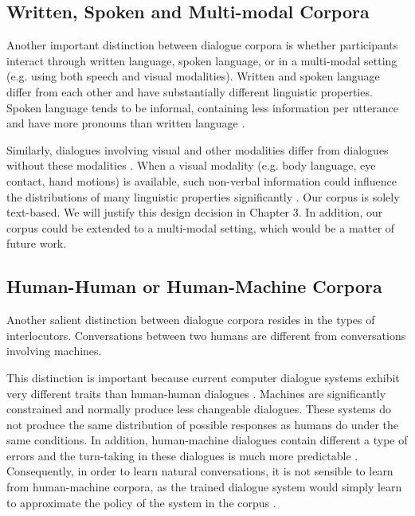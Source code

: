 \documentclass[bsc,frontabs,twoside,singlespacing,parskip,deptreport]{infthesis}     %
\begin{document}
\subsection{Written, Spoken and Multi-modal Corpora}

Another important distinction between dialogue corpora is whether participants interact through written language, spoken language, or in a multi-modal setting (e.g. using both speech and visual modalities). Written and spoken language differ from each other and have substantially different linguistic properties. Spoken language tends to be informal, containing less information per utterance and have more pronouns than written language \cite{carter2006cambridge,biber2001diachronic}.

Similarly, dialogues involving visual and other modalities differ from dialogues without these modalities \cite{serban2015survey,duncan1983charles}. When a visual modality (e.g. body language, eye contact, hand motions) is available, such non-verbal information could influence the distributions of many linguistic properties significantly \cite{gibson1963perception,lord1974perception,cooper1974control,chartrand1999chameleon,de2013speaker}. Our corpus is solely text-based. We will justify this design decision in Chapter 3. In addition, our corpus could be extended to a multi-modal setting, which would be a matter of future work.

\subsection{Human-Human or Human-Machine Corpora}

Another salient distinction between dialogue corpora resides in the types of interlocutors. Conversations between two humans are different from conversations involving machines.

This distinction is important because current computer dialogue systems exhibit very different traits than human-human dialogues \cite{doran2003comparing}. Machines are significantly constrained and normally produce less changeable dialogues. These systems do not produce the same distribution of possible responses as humans do under the same conditions. In addition, human-machine dialogues contain different a type of errors and the turn-taking in these dialogues is much more predictable \cite{williams2007partially}. Consequently, in order to learn natural conversations, it is not sensible to learn from human-machine corpora, as the trained dialogue system would simply learn to approximate the policy of the system in the corpus \cite{serban2018survey}.
\end{document}
